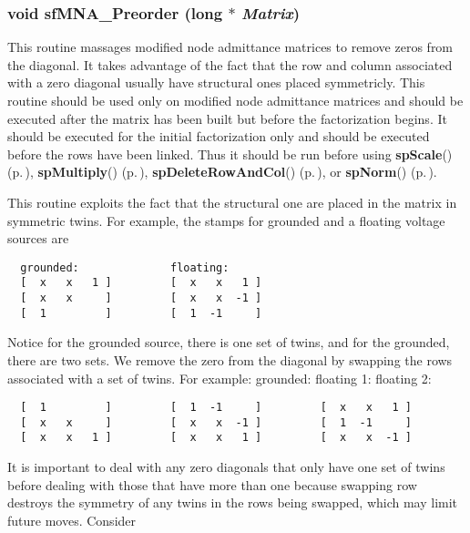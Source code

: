 \subsubsection{\setlength{\rightskip}{0pt plus 5cm}void sf\-MNA\_\-Preorder (long $\ast$ {\em Matrix})}\label{spFortran_8c_a70}


This routine massages modified node admittance matrices to remove zeros from the diagonal. It takes advantage of the fact that the row and column associated with a zero diagonal usually have structural ones placed symmetricly. This routine should be used only on modified node admittance matrices and should be executed after the matrix has been built but before the factorization begins. It should be executed for the initial factorization only and should be executed before the rows have been linked. Thus it should be run before using {\bf sp\-Scale}() {\rm (p.\,\pageref{spUtils_8c_a12})}, {\bf sp\-Multiply}() {\rm (p.\,\pageref{spUtils_8c_a14})}, {\bf sp\-Delete\-Row\-And\-Col}() {\rm (p.\,\pageref{spUtils_8c_a18})}, or {\bf sp\-Norm}() {\rm (p.\,\pageref{spUtils_8c_a21})}.

This routine exploits the fact that the structural one are placed in the matrix in symmetric twins. For example, the stamps for grounded and a floating voltage sources are 

\footnotesize\begin{verbatim}  grounded:              floating:
  [  x   x   1 ]         [  x   x   1 ]
  [  x   x     ]         [  x   x  -1 ]
  [  1         ]         [  1  -1     ]
\end{verbatim}\normalsize 
 Notice for the grounded source, there is one set of twins, and for the grounded, there are two sets. We remove the zero from the diagonal by swapping the rows associated with a set of twins. For example: grounded: floating 1: floating 2: 

\footnotesize\begin{verbatim}  [  1         ]         [  1  -1     ]         [  x   x   1 ]
  [  x   x     ]         [  x   x  -1 ]         [  1  -1     ]
  [  x   x   1 ]         [  x   x   1 ]         [  x   x  -1 ]
\end{verbatim}\normalsize 


It is important to deal with any zero diagonals that only have one set of twins before dealing with those that have more than one because swapping row destroys the symmetry of any twins in the rows being swapped, which may limit future moves. Consider 

